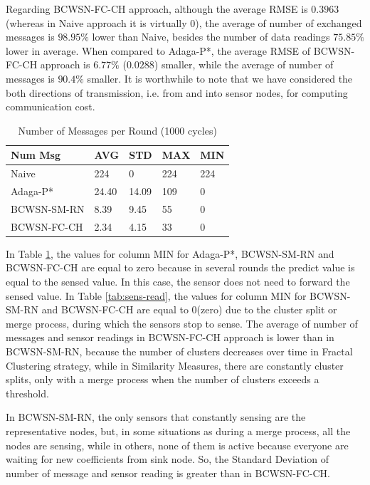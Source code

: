 \documentclass{acm_proc_article-sp}
\begin{document}
Regarding BCWSN-FC-CH approach, although the average RMSE is $0.3963$ (whereas
in Naive approach it is virtually $0$), the average of number of exchanged
messages is $98.95\%$ lower than Naive, besides the number of data readings
$75.85\%$ lower in average. When compared to Adaga-P*, the average RMSE of
BCWSN-FC-CH approach is $6.77\%$ ($0.0288$) smaller, while the average of number
of messages is $90.4\%$ smaller. It is worthwhile to note that we have
considered the both directions of transmission, i.e. from and into sensor nodes,
for computing communication cost.



\begin{table}[h!]
\caption{Number of Messages per Round (1000 cycles)}
\label{tab:num-msg}
\begin{center}
\begin{tabular}{|l||l|l|l|l|}
\hline
Num Msg &AVG &STD &MAX &MIN \\
\hline\hline
Naive &224 &0 &224 &224 \\
\hline
Adaga-P* &24.40 &14.09 &109 &0 \\
\hline
BCWSN-SM-RN &8.39 &9.45 &55 &0 \\
\hline
BCWSN-FC-CH &2.34 &4.15 &33 &0 \\
\hline
\end{tabular}
\end{center}
\end{table}

In Table \ref{tab:num-msg}, the values for column MIN for Adaga-P*, BCWSN-SM-RN
and BCWSN-FC-CH are equal to zero because in several rounds the predict value is
equal to the sensed value. In this case, the sensor does not need to forward the
sensed value. In Table \ref{tab:sens-read}, the values for column MIN for
BCWSN-SM-RN and BCWSN-FC-CH are equal to 0(zero) due to the cluster split or
merge process, during which the sensors stop to sense. 
The average of number of messages and sensor readings in BCWSN-FC-CH approach is
lower than in BCWSN-SM-RN, because the number of clusters decreases over time in
Fractal Clustering strategy, while in Similarity Measures, there are constantly
cluster splits, only with a merge process when the number of clusters exceeds a
threshold.

In BCWSN-SM-RN, the only sensors that constantly sensing are the representative
nodes, but, in some situations as during a merge process, all the nodes are
sensing, while in others, none of them is active because everyone are waiting
for new coefficients from sink node.
So, the Standard Deviation of number of message and sensor reading is greater
than in BCWSN-FC-CH.
\end{document}
